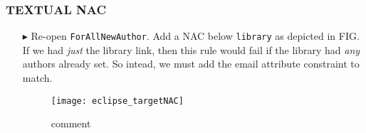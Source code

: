 \hypertarget{NAC tex}{}
\subsubsection{TEXTUAL NAC}
\texHeader

\begin{itemize}

\item[$\blacktriangleright$] Re-open \texttt{ForAllNewAuthor}. Add a NAC below \texttt{library} as depicted in FIG. If we had \emph{just} the library link,
then this rule would fail if the library had \emph{any} authors already set. So intead, we must add the email attribute constraint to match.

\begin{figure}[htbp]
\begin{center}
  \texttt{[image: eclipse\_targetNAC]}
  \caption{comment}
  \label{eclipse:existingAuthorNAC}
\end{center}
\end{figure}

\end{itemize}
